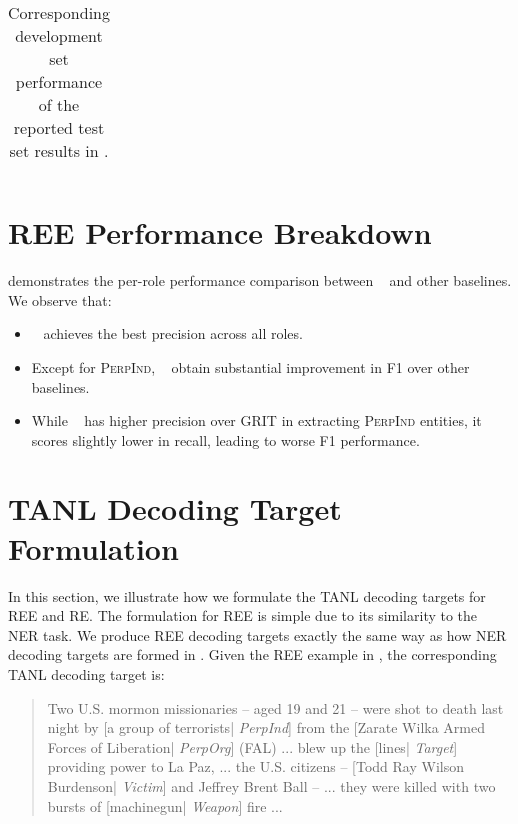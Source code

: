 \documentclass[11pt]{article}
\begin{document}
\begin{table*}[h]
{\begin{tabular}{lccccccccc}
        
        \bottomrule
    \end{tabular}
    }
    \vspace{-2mm}
    \caption{Corresponding development set performance of the reported test set results in .}
    \label{tab:dev_set_performance}
    
\end{table*} 

\section{REE Performance Breakdown}
\label{sec:ree_breakdown}
 demonstrates the per-role performance comparison between \modelshort~ and other baselines. We observe that:
\begin{itemize}
\item \modelshort~ achieves the best precision across all roles.
\item Except for \textsc{PerpInd}, \modelshort~ obtain substantial improvement in F1 over other baselines.
\item While \modelshort~ has higher precision over GRIT in extracting \textsc{PerpInd} entities, it scores slightly lower in recall, leading to worse F1 performance.

\end{itemize}


\section{TANL Decoding Target Formulation}
\label{sec:TANL_targets}
In this section, we illustrate how we formulate the TANL \cite{paolini2021structured} decoding targets for REE and RE. The formulation for REE is simple due to its similarity to the NER task. We produce REE decoding targets exactly the same way as how NER decoding targets are formed in \citet{paolini2021structured}. Given the REE example in , the corresponding TANL decoding target is:
\begin{quote}
    Two U.S. mormon missionaries -- aged 19 and 21 -- were shot to death last night by [a group of terrorists| \textit{PerpInd}] from the [Zarate Wilka Armed Forces of Liberation| \textit{PerpOrg}] (FAL) ... blew up the [lines| \textit{Target}] providing power to La Paz, ... the U.S. citizens -- [Todd Ray Wilson Burdenson| \textit{Victim}] and Jeffrey Brent Ball -- ... they were killed with two bursts of [machinegun| \textit{Weapon}] fire ...
\end{quote}
\end{document}
